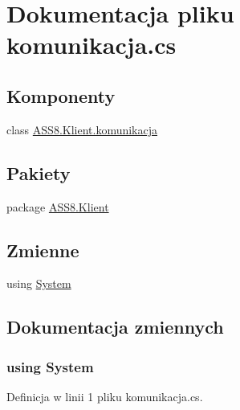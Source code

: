 \hypertarget{a00049}{
\section{Dokumentacja pliku komunikacja.cs}
\label{d2/dee/a00049}
}
\subsection*{Komponenty}
\begin{CompactItemize}
\item 
class \hyperlink{a00013}{ASS8.Klient.komunikacja}
\end{CompactItemize}
\subsection*{Pakiety}
\begin{CompactItemize}
\item 
package \hyperlink{a00060}{ASS8.Klient}
\end{CompactItemize}
\subsection*{Zmienne}
\begin{CompactItemize}
\item 
﻿using \hyperlink{a00049_81a223a02c34d82b47199f08308847f2}{System}
\end{CompactItemize}


\subsection{Dokumentacja zmiennych}
\hypertarget{a00049_81a223a02c34d82b47199f08308847f2}{
\subsubsection[{System}]{\setlength{\rightskip}{0pt plus 5cm}﻿using {\bf System}}}
\label{d2/dee/a00049_81a223a02c34d82b47199f08308847f2}




Definicja w linii 1 pliku komunikacja.cs.